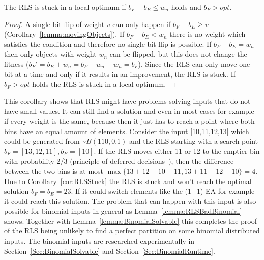 \begin{corollary}\label{cor:RLSStuck}
    The RLS is stuck in a local optimum if \(b_F-b_E \le w_n\) holds and \(b_F > opt\).
\end{corollary}
\begin{proof}
    A single bit flip of weight $v$ can only happen if \(b_F - b_E \ge v\) (Corollary~\ref{lemma:movingObjects}). If \(b_F-b_E < w_n\) there is no weight which satisfies the condition and therefore no single bit flip is possible.
    If \(b_F-b_E = w_n\) then only objects with weight \(w_n\) can be flipped, but this does not change the fitness ($b_F' = b_E + w_n = b_F - w_n +w_n = b_F$).
    Since the RLS can only move one bit at a time and only if it results in an improvement, the RLS is stuck.
    If \(b_F > opt\) holds the RLS is stuck in a local optimum.
\end{proof}

This corollary shows that RLS might have problems solving inputs that do not have small values.
It can still find a solution and even in most cases for example if every weight is the same, because then it just has to reach a point where both bins have an equal amount of elements.
Consider the input [10,11,12,13] which could be generated from \textasciitilde$B(110,0.1)$ and the RLS starting with a search point $b_F=[13,12,11], b_E=[10]$.
If the RLS moves either 11 or 12 to the emptier bin with probability 2/3 (principle of deferred decisions~\cite{raghavan1995randomized}), then the difference between the two bins is at most $\max\{13+12-10-11,13+11-12-10\}=4$.
Due to Corollary~\ref{cor:RLSStuck} the RLS is stuck and won't reach the optimal solution $b_F=b_E=23$.
If it could switch elements like the (1+1) EA for example it could reach this solution.
The problem that can happen with this input is also possible for binomial inputs in general as Lemma~\ref{lemma:RLSBadBinomial} shows.
Together with Lemma~\ref{lemma:BinomialSolvable} this completes the proof of the RLS being unlikely to find a perfect partition on some binomial distributed inputs.
The binomial inputs are researched experimentally in Section~\ref{Sec:BinomialSolvable} and Section~\ref{Sec:BinomialRuntime}.

